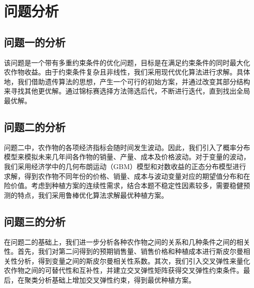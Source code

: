 \documentclass[12pt]{ctexart}
\begin{document}
	\section{问题分析}  
	\subsection{问题一的分析}  
	该问题是一个带有多重约束条件的优化问题，目标是在满足约束条件的同时最大化农作物收益。由于约束条件复杂且非线性，我们采用现代优化算法进行求解。具体地，我们借助遗传算法的思想，产生一个可行的初始方案，并通过改变其部分结构来寻找其他更优解。通过锦标赛选择方法筛选后代，不断进行迭代，直到找出全局最优解。  
	
	\subsection{问题二的分析}  
	问题二中，农作物的各项经济指标会随时间发生波动。因此，我们引入了概率分布模型来模拟未来几年间各作物的销量、产量、成本及价格波动。对于变量的波动，我们采用经济学中的几何布朗运动（GBM）模型和对数收益的正态分布模型进行求解，得到农作物不同年份的价格、销量、成本与波动变量对应的期望值分布和在险价值。考虑到种植方案的连续性需求，结合本题不稳定性因素较多，需要稳健预测的特点，我们采用鲁棒优化算法求解最优种植方案。
	
	\subsection{问题三的分析}  
	在问题二的基础上，我们进一步分析各种农作物之间的关系和几种条件之间的相关性。首先，我们对第二问得到的预期销售量、销售价格和种植成本进行斯皮尔曼相关性分析，得到变量之间的斯皮尔曼相关性系数。其次，我们引入交叉弹性来量化农作物之间的可替代性和互补性，并建立交叉弹性矩阵获得交叉弹性约束条件。最后，在聚类分析基础上增加交叉弹性约束，得到最优种植方案。  
	
	
\end{document}
